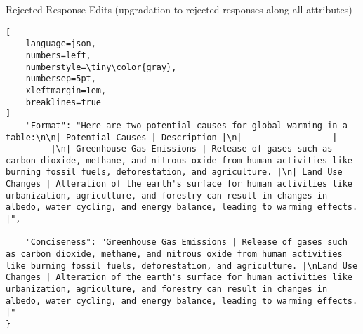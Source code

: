 \begin{promptbox}{Rejected Response Edits (upgradation to rejected responses along all attributes)}
\begin{lstlisting}[
    language=json,
    numbers=left,
    numberstyle=\tiny\color{gray},
    numbersep=5pt,
    xleftmargin=1em,
    breaklines=true
]
    "Format": "Here are two potential causes for global warming in a table:\n\n| Potential Causes | Description |\n| -----------------|-------------|\n| Greenhouse Gas Emissions | Release of gases such as carbon dioxide, methane, and nitrous oxide from human activities like burning fossil fuels, deforestation, and agriculture. |\n| Land Use Changes | Alteration of the earth's surface for human activities like urbanization, agriculture, and forestry can result in changes in albedo, water cycling, and energy balance, leading to warming effects. |",
    
    "Conciseness": "Greenhouse Gas Emissions | Release of gases such as carbon dioxide, methane, and nitrous oxide from human activities like burning fossil fuels, deforestation, and agriculture. |\nLand Use Changes | Alteration of the earth's surface for human activities like urbanization, agriculture, and forestry can result in changes in albedo, water cycling, and energy balance, leading to warming effects. |"
}
\end{lstlisting}

\end{promptbox}

            
            
            
            
